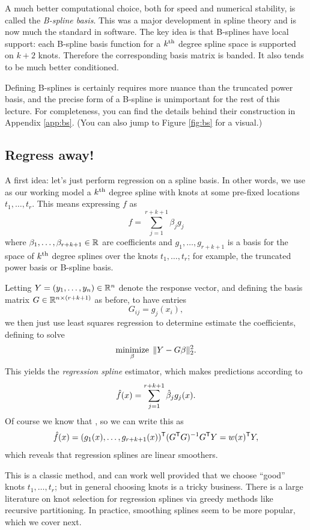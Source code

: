 \documentclass{article}
\begin{document}
A much better computational choice, both for speed and numerical stability, is 
called the \emph{B-spline basis}. This was a major development in spline theory 
and is now much the standard in software. The key idea is that B-splines have
local support: each B-spline basis function for a $k^{\text{th}}$ degree spline space is
supported on $k+2$ knots. Therefore the corresponding basis matrix is banded. It
also tends to be much better conditioned.  

Defining B-splines is certainly requires more nuance than the truncated power
basis, and the precise form of a B-spline is unimportant for the rest of this
lecture. For completeness, you can find the details behind their construction in
Appendix \ref{app:bs}. (You can also jump to Figure \ref{fig:bs} for a visual.) 

\subsection{Regress away!}

A first idea: let's just perform regression on a spline basis. In other words,
we use as our working model a $k^{\text{th}}$ degree spline with knots at some pre-fixed 
locations $t_1,\dots,t_r$. This means expressing $f$ as  
\[
f = \sum_{j=1}^{r+k+1} \beta_j g_j
\]
where $\beta_1,\dots,\beta_{r+k+1} \in \mathbb{R}$ are coefficients and
$g_1,\dots,g_{r+k+1}$ is a basis for the space of $k^{\text{th}}$ degree splines over the
knots $t_1,\dots,t_r$; for example, the truncated power basis or B-spline basis.    

Letting $Y=(y_1,\dots,y_n) \in \mathbb{R}^n$ denote the response vector, and defining
the basis matrix $G \in \mathbb{R}^{n \times (r+k+1)}$ as before, to have entries
\[
G_{ij} = g_j(x_i),
\]
we then just use least squares regression to determine estimate the
coefficients, defining  to
solve 
\[
\mathop{\mathrm{minimize}}_\beta \; \|Y - G\beta\|_2^2.
\]
This yields the \emph{regression spline} estimator, which makes predictions
according to   
\[
\hat{f}(x) = \sum_{j=1}^{r+k+1} \hat{\beta}_j g_j(x).
\]
Of course we know that , so we can write
this as 
\[
\hat{f}(x) = (g_1(x),\dots,g_{r+k+1}(x))^{\mathsf{T}} (G^{\mathsf{T}} G)^{-1} G^{\mathsf{T}} Y = w(x)^{\mathsf{T}} Y,  
\]
which reveals that regression splines are linear smoothers.

This is a classic method, and can work well provided that we choose ``good''
knots $t_1,\dots,t_r$; but in general choosing knots is a tricky business. There
is a large literature on knot selection for regression splines via greedy
methods like recursive partitioning. In practice, smoothing splines seem to be
more popular, which we cover next.
\end{document}
